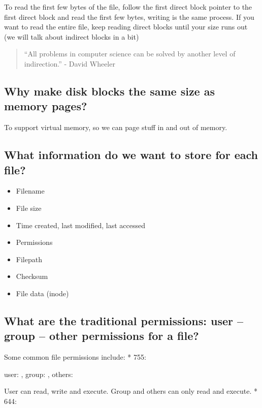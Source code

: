 To read the first few bytes of the file, follow the first direct block pointer to the first direct block and read the first few bytes, writing is the same process. If you want to read the entire file, keep reading direct blocks until your size runs out (we will talk about indirect blocks in a bit)

\begin{quote}
``All problems in computer science can be solved by another level of indirection.'' - David Wheeler
\end{quote}

\subsection{Why make disk blocks the same size as memory pages?}\label{why-make-disk-blocks-the-same-size-as-memory-pages}

To support virtual memory, so we can page stuff in and out of memory.

\subsection{What information do we want to store for each file?}\label{what-information-do-we-want-to-store-for-each-file}

\begin{itemize}
\tightlist
\item
  Filename
\item
  File size
\item
  Time created, last modified, last accessed
\item
  Permissions
\item
  Filepath
\item
  Checksum
\item
  File data (inode)
\end{itemize}

\subsection{What are the traditional permissions: user -- group -- other permissions for a file?}\label{what-are-the-traditional-permissions-user-group-other-permissions-for-a-file}

Some common file permissions include: * 755: 

user: , group: , others: 

User can read, write and execute. Group and others can only read and execute. * 644: 

